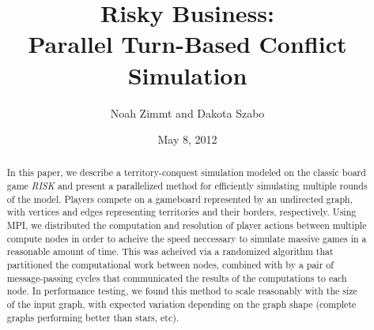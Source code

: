 \documentclass[10pt]{article}
\title{
	\textbf{
		Risky Business: \\Parallel Turn-Based Conflict Simulation
	}
}
\author{Noah Zimmt and Dakota Szabo}
\date{May 8, 2012}
\begin{document}
	\maketitle
	\begin{abstract}
		In this paper, we describe a territory-conquest simulation modeled on the classic board game \emph{RISK} and present a parallelized method for efficiently simulating multiple rounds of the model. 
		Players compete on a gameboard represented by an undirected graph, with vertices and edges representing territories and their borders, respectively. 
		Using MPI, we distributed the computation and resolution of player actions between multiple compute nodes in order to acheive the speed neccessary to simulate massive games in a reasonable amount of time. 
		This was acheived via a randomized algorithm that partitioned the computational work between nodes, combined with by a pair of message-passing cycles that communicated the results of the computations to each node. 
		In performance testing, we found this method to scale reasonably with the size of the input graph, with expected variation depending on the graph shape (complete graphs performing better than stars, etc).
	\end{abstract}
\end{document}
